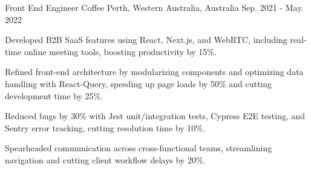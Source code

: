\begin{cventries}
  \cventry
  {Front End Engineer} %
  {Coffee} %
  {Perth, Western Australia, Australia} %
  {Sep. 2021 - May. 2022} %
  {
    \begin{cvitems} %
      \item {Developed B2B SaaS features using React, Next.js, and WebRTC, including real-time online meeting tools, boosting productivity by 15\%.}
      \item {Refined front-end architecture by modularizing components and optimizing data handling with React-Query, speeding up page loads by 50\% and cutting development time by 25\%.}
      \item {Reduced bugs by 30\% with Jest unit/integration tests, Cypress E2E testing, and Sentry error tracking, cutting resolution time by 10\%.}
      \item {Spearheaded communication across cross-functional teams, streamlining navigation and cutting client workflow delays by 20\%.}
    \end{cvitems}
  }


\end{cventries}
